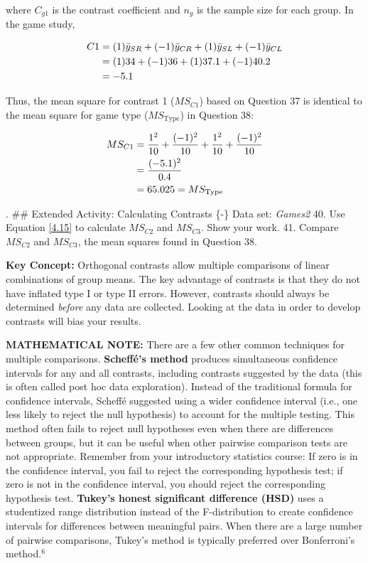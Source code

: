\documentclass[
]{report}
\begin{document}
where \(C_{g1}\) is the contrast coefficient and \(n_g\) is the sample size for each group. In the game study,

\begin{align}
C1 &= (1)\bar{y}_{SR} + (-1)\bar{y}_{CR} + (1)\bar{y}_{SL} + (-1)\bar{y}_{CL} \notag \\
   &= (1)34 + (-1)36 + (1)37.1 + (-1)40.2 \notag \\
   &= -5.1 \notag
\end{align}

Thus, the mean square for contrast 1 (\(MS_{C1}\)) based on Question 37 is identical to the mean square for game type (\(MS_{\text{Type}}\)) in Question 38:

\begin{align}
MS_{C1} &= \frac{1^2}{10} + \frac{(-1)^2}{10} + \frac{1^2}{10} + \frac{(-1)^2}{10} \notag \\
        &= \frac{(-5.1)^2}{0.4} \notag \\
        &= 65.025 = MS_{\text{Type}} \notag
\end{align}

.
\#\# Extended Activity: Calculating Contrasts \{-\}
\textbar{} Data set: \emph{Games2}
40. Use Equation \ref{4.15} to calculate \(MS_{C2}\) and \(MS_{C3}\). Show your work.
41. Compare \(MS_{C2}\) and \(MS_{C3}\), the mean squares found in Question 38.

\large

\textbf{Key Concept:}
Orthogonal contrasts allow multiple comparisons of linear combinations of group means. The key advantage of contrasts is that they do not have inflated type I or type II errors. However, contrasts should always be determined \emph{before} any data are collected. Looking at the data in order to develop contrasts will bias your results.
\normalsize

\large

\textbf{MATHEMATICAL NOTE:}
There are a few other common techniques for multiple comparisons. \textbf{Scheffé's method} produces simultaneous confidence intervals for any and all contrasts, including contrasts suggested by the data (this is often called post hoc data exploration). Instead of the traditional formula for confidence intervals, Scheffé suggested using a wider confidence interval (i.e., one less likely to reject the null hypothesis) to account for the multiple testing. This method often fails to reject null hypotheses even when there are differences between groups, but it can be useful when other pairwise comparison tests are not appropriate. Remember from your introductory statistics course: If zero is in the confidence interval, you fail to reject the corresponding hypothesis test; if zero is not in the confidence interval, you should reject the corresponding hypothesis test. \textbf{Tukey's honest significant difference (HSD)} uses a studentized range distribution instead of the F-distribution to create confidence intervals for differences between meaningful pairs. When there are a large number of pairwise comparisons, Tukey's method is typically preferred over Bonferroni's method.\(^6\)
\normalsize
\end{document}

